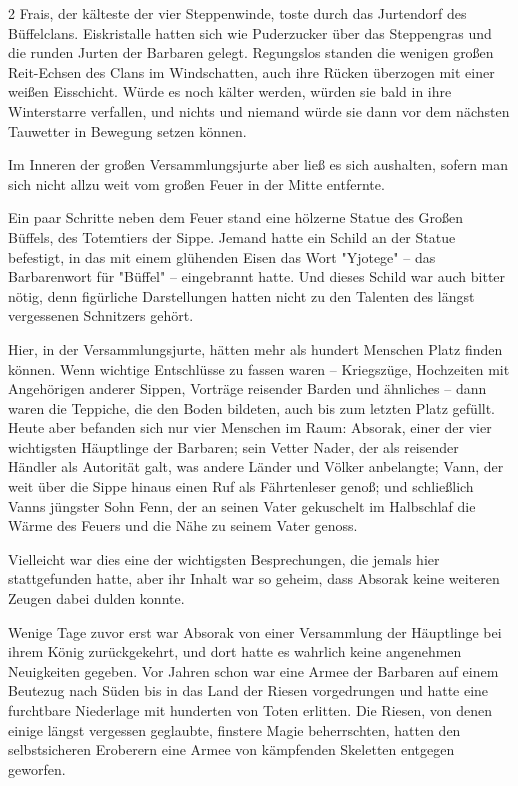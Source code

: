\documentclass[10pt, a4paper, oneside]{book}
\begin{document}
\begin{multicols}{2}
Frais, der kälteste der vier Steppenwinde, toste durch das Jurtendorf des Büffelclans. Eiskristalle hatten sich wie Puderzucker über das Steppengras und die runden Jurten der Barbaren gelegt. Regungslos standen die wenigen großen Reit-Echsen des Clans im Windschatten, auch ihre Rücken überzogen mit einer weißen Eisschicht. Würde es noch kälter werden, würden sie bald in ihre Winterstarre verfallen, und nichts und niemand würde sie dann vor dem nächsten Tauwetter in Bewegung setzen können.

Im Inneren der großen Versammlungsjurte aber ließ es sich aushalten, sofern man sich nicht allzu weit vom großen Feuer in der Mitte entfernte.

Ein paar Schritte neben dem Feuer stand eine hölzerne Statue des Großen Büffels, des Totemtiers der Sippe. Jemand hatte ein Schild an der Statue befestigt, in das mit einem glühenden Eisen das Wort "Yjotege" – das Barbarenwort für "Büffel" – eingebrannt hatte. Und dieses Schild war auch bitter nötig, denn figürliche Darstellungen hatten nicht zu den Talenten des längst vergessenen Schnitzers gehört.

Hier, in der Versammlungsjurte, hätten mehr als hundert Menschen Platz finden können. Wenn wichtige Entschlüsse zu fassen waren – Kriegszüge, Hochzeiten mit Angehörigen anderer Sippen, Vorträge reisender Barden und ähnliches – dann waren die Teppiche, die den Boden bildeten, auch bis zum letzten Platz gefüllt. Heute aber befanden sich nur vier Menschen im Raum: Absorak, einer der vier wichtigsten Häuptlinge der Barbaren; sein Vetter Nader, der als reisender Händler als Autorität galt, was andere Länder und Völker anbelangte; Vann, der weit über die Sippe hinaus einen Ruf als Fährtenleser genoß; und schließlich Vanns jüngster Sohn Fenn, der an seinen Vater gekuschelt im Halbschlaf die Wärme des Feuers und die Nähe zu seinem Vater genoss.

Vielleicht war dies eine der wichtigsten Besprechungen, die jemals hier stattgefunden hatte, aber ihr Inhalt war so geheim, dass Absorak keine weiteren Zeugen dabei dulden konnte.

Wenige Tage zuvor erst war Absorak von einer Versammlung der Häuptlinge bei ihrem König zurückgekehrt, und dort hatte es wahrlich keine angenehmen Neuigkeiten gegeben. Vor Jahren schon war eine Armee der Barbaren auf einem Beutezug nach Süden bis in das Land der Riesen vorgedrungen und hatte eine furchtbare Niederlage mit hunderten von Toten erlitten. Die Riesen, von denen einige längst vergessen geglaubte, finstere Magie beherrschten, hatten den selbstsicheren Eroberern eine Armee von kämpfenden Skeletten entgegen geworfen.


\end{multicols}
\end{document}

